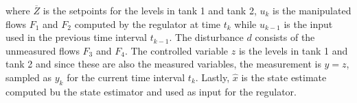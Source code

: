  where $\overline{Z}$ is the setpoints for the levels in tank 1 and tank 2, $u_k$ is the manipulated flows $F_1$ and $F_2$ computed by the regulator at time $t_k$ while $u_{k-1}$ is the input used in the previous time interval $t_{k-1}$. The disturbance $d$ consists of the unmeasured flows $F_3$ and $F_4$. The controlled variable $z$ is the levels in tank 1 and tank 2 and since these are also the measured variables, the measurement is $y = z$, sampled as $y_k$ for the current time interval $t_k$. Lastly, $\hat{x}$ is the state estimate computed bu the state estimator and used as input for the regulator. 